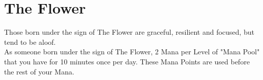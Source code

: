 \section{The Flower}

Those born under the sign of The Flower are graceful, resilient and focused, but tend to be aloof.\\
As someone born under the sign of The Flower, 2 Mana per Level of "Mana Pool" that you have for 10 minutes once per day. These Mana Points are used before the rest of your Mana.\\
